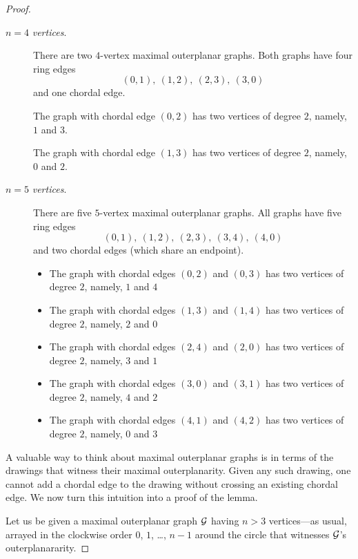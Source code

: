 \begin{proof}
\begin{description}
\medskip
\item[$n=4$ {\em vertices}.]
There are two $4$-vertex maximal outerplanar graphs.  Both graphs have four ring edges
\[ (0,1), \ (1,2), \ (2,3), \ (3,0)  \]
and one chordal edge.

\smallskip

The graph with chordal edge $(0, 2)$ has two vertices of degree $2$, namely, $1$ and $3$.

\smallskip

The graph with chordal edge $(1, 3)$ has two vertices of degree $2$, namely, $0$ and $2$.

\medskip
\item[$n=5$ {\em vertices}.]
There are five $5$-vertex maximal outerplanar graphs.  All graphs have five ring edges
\[ (0,1), \ (1,2), \ (2,3), \ (3,4) , \ (4, 0)  \]
and two chordal edges (which share an endpoint).

\begin{itemize}
\item
The graph with chordal edges $(0,2)$ and $(0,3)$ has two vertices of degree $2$, namely, $1$ and $4$
\item
The graph with chordal edges $(1,3)$ and $(1,4)$ has two vertices of degree $2$, namely, $2$ and $0$

\item
The graph with chordal edges $(2,4)$ and $(2,0)$ has two vertices of degree $2$, namely, $3$ and $1$

\item
The graph with chordal edges $(3,0)$ and $(3,1)$ has two vertices of degree $2$, namely, $4$ and $2$

\item
The graph with chordal edges $(4,1)$ and $(4,2)$ has two vertices of degree $2$, namely, $0$ and $3$
\end{itemize}
\end{description}

\medskip

A valuable way to think about maximal outerplanar graphs is in terms of the drawings that witness their maximal outerplanarity.  Given any such drawing, one cannot add a chordal edge to the drawing without crossing an existing chordal edge.  We now turn this intuition into a proof of the lemma.

\smallskip

Let us be given a maximal outerplanar graph $\mbox{$\cal G$}$ having $n > 3$ vertices---as usual, arrayed in the clockwise order $0$, $1$, \ldots, $n-1$ around the circle that witnesses $\mbox{$\cal G$}$'s outerplanararity.


\end{proof}
